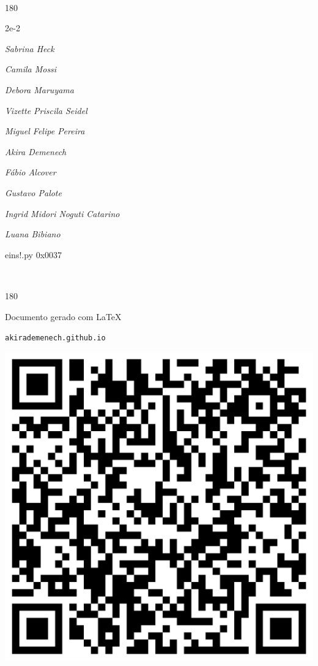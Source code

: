 \documentclass[12pt]{article}
\begin{document}
	\ 
	\vfill
	\begin{turn}{180}	
		\begin{minipage}{\textwidth}
		  	\ttfamily %
			\centering
			{\Huge 2e-2}
		  
			\hfill
		  
			

\textit{\small Sabrina Heck}

\textit{\small Camila Mossi}

\textit{\small Debora Maruyama}

\textit{\small Vizette Priscila Seidel}

\textit{\small Miguel Felipe Pereira}

\textit{\small Akira Demenech}

\textit{\small Fábio Alcover}

\textit{\small Gustavo Palote}

\textit{\small Ingrid Midori Noguti Catarino}

\textit{\small Luana Bibiano}

\bigskip

eins!.py
0x0037


		\end{minipage}	
	\end{turn}
	\vfill
	\

\pagebreak

	\begin{turn}{180}	
		\begin{minipage}{\textwidth}		  
		  Documento gerado com \LaTeX			
		  
		  \texttt{akirademenech.github.io}

		  \includegraphics[height=0.3\textheight]{2e-2.pdf}

		\end{minipage}	
	\end{turn}  
		  
\end{document}
